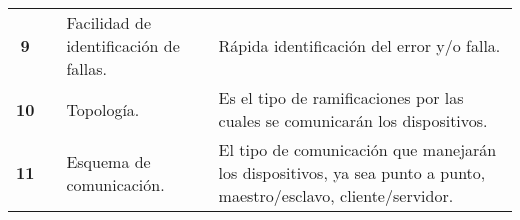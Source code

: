 \begin{table}[H]
\begin{tabular}{|c|c|p{10em}|p{23em}|}
		\cline{1-1}\cline{3-4}    \textbf{ 9} &       &  Facilidad de identificación de fallas. &  Rápida identificación del error y/o falla. \\
		\cline{1-1}\cline{3-4}    \textbf{ 10} &       &  Topología. &  Es el tipo de ramificaciones por las cuales se comunicarán los dispositivos. \\
		\cline{1-1}\cline{3-4}    \textbf{ 11} &       &  Esquema de comunicación. &  El tipo de comunicación que manejarán los dispositivos, ya sea punto a punto, maestro/esclavo, cliente/servidor. \\
		\hline	
	\end{tabular}%
	\label{tab:addlabel}%
\end{table}%

\newpage

